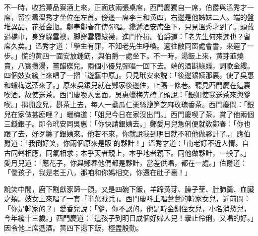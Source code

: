 不一時，收拾菓品案酒上來，正面放兩張桌席，西門慶獨自一席，伯爵與溫秀才一席，留空着溫秀才坐位在左首。傍邊一席李三和黄四，右邊是他姊妹二人。端的盤堆異品，花插金瓶。鄭奉鄭春在傍彈唱。纔遞酒安席坐下，只見溫秀才到了。頭戴過橋巾，身穿綠雲襖，脚穿雲履絨襪，進門作揖。伯爵道：「老先生何來遲也？留席久矣。」溫秀才道：「學生有罪，不知老先生呼喚。適往敝同窗處會書，來遲了一步。」慌的黄四一面安放鍾筯，與伯爵一處坐下。不一時，湯飯上來，黄芽韮燒賣，八寳攢湯，薑醋碟兒。兩個小優兒彈唱一回下去。端的酒斟綠蟻，詞歌金縷。四個妓女纔上來唱了一摺「遊藝中原」。只見玳安來説：「後邊銀姨那裏，使了吳惠和蠟梅送茶來了。」原來吳銀兒就在鄭家後邊住，止隔一條巷。聽見西門慶在這裏喫酒，故使送茶。西門慶喚入裏面，吳惠蠟梅先磕了頭說：「銀姐使我送茶來與爹喫。」揭開盒兒，斟茶上去，每人一盞瓜仁栗絲鹽笋芝麻玫瑰香茶。西門慶問：「銀兒在家做甚麽哩？」蠟梅道：「姐兒今日在家沒出門。」西門慶喫了茶，賞了他兩個三錢銀子。即令玳安同吳惠：「你快請銀姨去。」鄭愛月兒急俐便就敎鄭春：「你也跟了去，好歹纏了銀姨來。他若不來，你就說我到明日就不和他做夥計了。」應伯爵道：「我倒好笑，你兩個原來是販𣭈的夥計！」溫秀才道：「南老好不近人情。自古同聲相應，同氣相求；本乎天者親上，本乎地者親下。同他做夥計，一般了。」愛月兒道：「應花子，你與鄭春他們都是夥計，當差供唱，都在一處。」伯爵道：「儍孩子，我是老王八，那咱和你媽相交，你還在肚子裏！」

說笑中間，廚下割獻豕蹄一領，又是四碗下飯，羊蹄黄芽、臊子韮、肚肺羹、血臟之類。妓女上來唱了一套「半萬賊兵」。西門慶呌上唱鶯鶯的韓家女兒，近前問：「你是韓家的？」愛香兒說：「爹，你不認的，他是韓金釧侄女兒，小名消愁兒，今年纔十三歲。」西門慶道：「這孩子到明日成個好婦人兒！擧止伶俐，又唱的好。」因令他上席遞酒。黄四下湯下飯，極盡殷勤。

